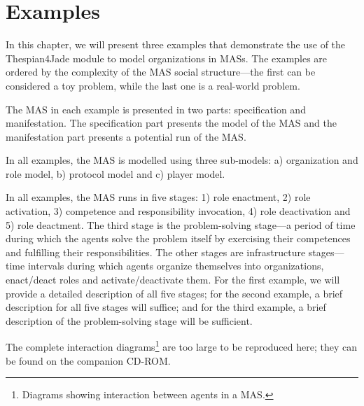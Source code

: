 
\chapter{Examples}

In this chapter, we will present three examples that demonstrate the use of the Thespian4Jade module to model organizations in MASs.
The examples are ordered by the complexity of the MAS social structure---the first can be considered a toy problem, while the last one is a real-world problem.

The MAS in each example is presented in two parts: specification and manifestation.
The specification part presents the model of the MAS and the manifestation part presents a potential run of the MAS.

In all examples, the MAS is modelled using three sub-models: a) organization and role model, b) protocol model and c) player model.

In all examples, the MAS runs in five stages: 1) role enactment, 2) role activation, 3) competence and responsibility invocation, 4) role deactivation and 5) role deactment.
The third stage is the problem-solving stage---a period of time during which the agents solve the problem itself by exercising their competences and fulfilling their responsibilities.
The other stages are infrastructure stages---time intervals during which agents organize themselves into organizations, enact/deact roles and activate/deactivate them.
For the first example, we will provide a detailed description of all five stages; for the second example, a brief description for all five stages will suffice; and for the third example, a brief description of the problem-solving stage will be sufficient.

The complete interaction diagrams\footnote{Diagrams showing interaction between agents in a MAS.} are too large to be reproduced here; they can be found on the companion CD-ROM. 






